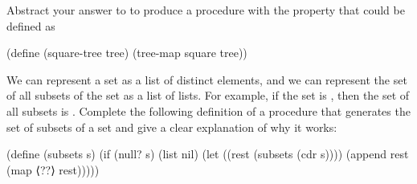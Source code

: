 \begin{exercise}
	\label{Exercise 2.31}
	Abstract your answer to  to produce a procedure  with the property that  could be defined as
	\begin{scheme}
	  (define (square-tree tree) (tree-map square tree))
	\end{scheme}
\end{exercise}



\begin{exercise}
	\label{Exercise 2.32}
	We can represent a set as a list of distinct elements, and we can represent the set of all subsets of the set as a list of lists.
	For example, if the set is , then the set of all subsets is .
	Complete the following definition of a procedure that generates the set of subsets of a set and give a clear explanation of why it works:
	\begin{scheme}
	  (define (subsets s)
	    (if (null? s)
	        (list nil)
	        (let ((rest (subsets (cdr s))))
	          (append rest (map ⟨??⟩ rest)))))
	\end{scheme}
\end{exercise}
